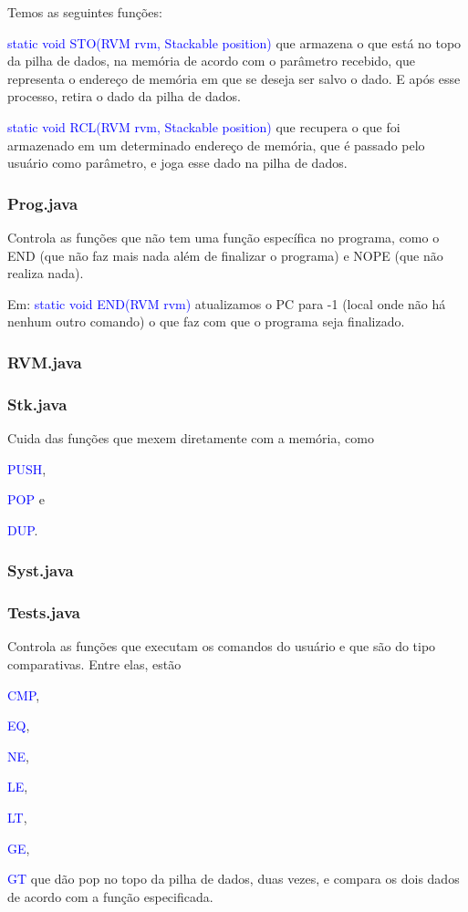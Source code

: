 \documentclass[a4paper]{article}
\begin{document}
{{{{{{{{{{{{{{{{{{{		    Temos as seguintes funções:
		    
		    {\textcolor{blue}{ static void STO(RVM rvm, 
		    Stackable position) }
		    que armazena o que está no topo da pilha de dados,
		    na memória de acordo com o parâmetro recebido, que
		    representa o endereço de memória em que se deseja
		    ser salvo o dado. E após esse processo, retira o
		    dado da pilha de dados.
		    
		    {\textcolor{blue}{ static void RCL(RVM rvm, 
		    Stackable position) }
		    que recupera o que foi armazenado em um determinado
		    endereço de memória, que é passado pelo usuário como
		    parâmetro, e joga esse dado na pilha de dados.
		    
		\subsubsection{ Prog.java }
		    Controla as funções que não tem uma função específica
		    no programa, como o END (que não faz mais nada além de
		    finalizar o programa) e NOPE (que não realiza nada).
		    
		    Em: {\textcolor{blue}{ static void END(RVM rvm) }}
		    atualizamos o PC para -1 (local onde não há nenhum
		    outro comando) o que faz com que o programa seja
		    finalizado.
		    
		\subsubsection{ RVM.java }
		\subsubsection{ Stk.java }
		    Cuida das funções que mexem diretamente com a
		    memória, como 
		    {\textcolor{blue}{PUSH}, 
		    {\textcolor{blue}{POP} e 
		    {\textcolor{blue}{DUP}.
		    
		    
		
		\subsubsection{ Syst.java }
		\subsubsection{ Tests.java }
		    Controla as funções que executam os comandos do
		    usuário e que são do tipo comparativas.
		    Entre elas, estão 
		    {\textcolor{blue}{CMP}, 
		    {\textcolor{blue}{EQ}, 
		    {\textcolor{blue}{NE}, 
		    {\textcolor{blue}{LE}, 
		    {\textcolor{blue}{LT},
		    {\textcolor{blue}{GE}, 
		    {\textcolor{blue}{GT}
		    que dão pop no topo da pilha de dados, duas vezes,
		    e compara os dois dados de acordo com a função
		    especificada. 
		    
}}}}}}}}}}}}}}}}}}}}}}}}}}}}}}}
\end{document}
